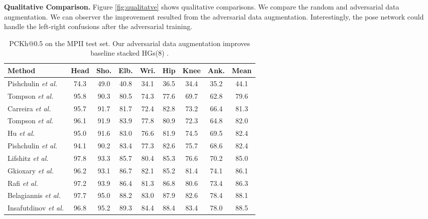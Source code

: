 \documentclass[10pt,twocolumn,letterpaper]{article}
\begin{document}
{\bf Qualitative Comparison.} Figure \ref{fig:qualitatve} shows qualitative comparisons. We compare the random and adversarial data augmentation. We can observer the improvement resulted from the adversarial data augmentation. Interestingly, the pose network could handle the left-right confusions after the adversarial training.

\begin{table}[htb]
\begin{center}
\caption{PCKh@0.5 on the MPII test set. Our adversarial data augmentation improves baseline stacked HGs(8) \cite{newell2016stacked}.}
\label{tb:MPII}
\small
\setlength\tabcolsep{1.5pt}
\begin{tabular}{@{}lcccccccc@{}}
\toprule
Method & Head & Sho. & Elb. & Wri. & Hip & Knee & Ank. & Mean\\
\hline
Pishchulin \textit{et al.}\cite{pishchulin2013strong} & 74.3 & 49.0 & 40.8 & 34.1 & 36.5 & 34.4 & 35.2 & 44.1\\
Tompson \textit{et al.}\cite{tompson2014joint} & 95.8 & 90.3 & 80.5 & 74.3 & 77.6 & 69.7 & 62.8 & 79.6\\
Carreira \textit{et al.}\cite{carreira2016human} & 95.7 & 91.7 & 81.7 & 72.4 & 82.8 & 73.2 & 66.4 & 81.3\\
Tompson \textit{et al.}\cite{tompson2015efficient}& 96.1 & 91.9 & 83.9 & 77.8 & 80.9 & 72.3 & 64.8 & 82.0\\
Hu \textit{et al.}\cite{hu2016bottom}& 95.0 & 91.6 & 83.0 & 76.6 & 81.9 & 74.5 & 69.5 & 82.4\\
Pishchulin \textit{et al.}\cite{pishchulin2016deepcut}&94.1 & 90.2 & 83.4 & 77.3 & 82.6 & 75.7 & 68.6 & 82.4\\
Lifshitz \textit{et al.}\cite{lifshitz2016human} & 97.8 & 93.3 & 85.7 & 80.4 & 85.3 & 76.6 & 70.2 & 85.0\\
Gkioxary \textit{et al.}\cite{gkioxari2016chained} & 96.2 & 93.1 & 86.7 & 82.1 & 85.2 & 81.4 & 74.1 & 86.1\\
Rafi \textit{et al.}\cite{rafi2016efficient} & 97.2 & 93.9 & 86.4 & 81.3 & 86.8 & 80.6 & 73.4 & 86.3\\
Belagiannis \textit{et al.}\cite{belagiannis2017recurrent}&97.7 & 95.0 & 88.2 & 83.0 & 87.9 & 82.6 & 78.4 & 88.1\\
Insafutdinov \textit{et al.}\cite{insafutdinov2016deepercut}&96.8 & 95.2 & 89.3 & 84.4 & 88.4 & 83.4 & 78.0 & 88.5\\

\end{tabular}
\end{center}
\end{table}
\end{document}
